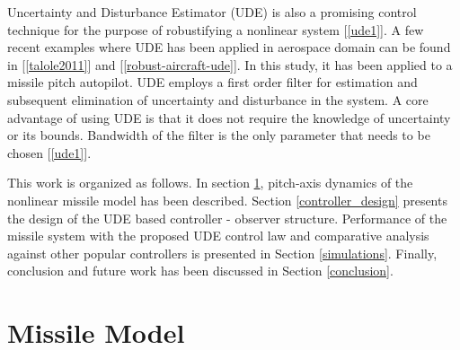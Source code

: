 \documentclass[conference]{IEEEtran}
\begin{document}
	Uncertainty and Disturbance Estimator (UDE) is also a promising control technique for the purpose of robustifying a nonlinear system [\ref{ude1}]. A few recent examples where UDE has been applied in aerospace domain can be found in [\ref{talole2011}] and [\ref{robust-aircraft-ude}]. In this study, it has been applied to a missile pitch autopilot. UDE employs a first order filter for estimation and subsequent elimination of uncertainty and disturbance in the system. A core advantage of using UDE is that it does not require the knowledge of uncertainty or its bounds. Bandwidth of the filter is the only parameter that needs to be chosen [\ref{ude1}].
	
	This work is organized as follows. In section \ref{missile_model}, pitch-axis dynamics of the nonlinear missile model has been described. Section \ref{controller_design} presents the design of the UDE based controller - observer structure. Performance of the missile system with the proposed UDE control law and comparative analysis against other popular controllers is presented in Section \ref{simulations}. Finally, conclusion and future work has been discussed in Section \ref{conclusion}.	
	
\section{Missile Model} \label{missile_model}
\end{document}

